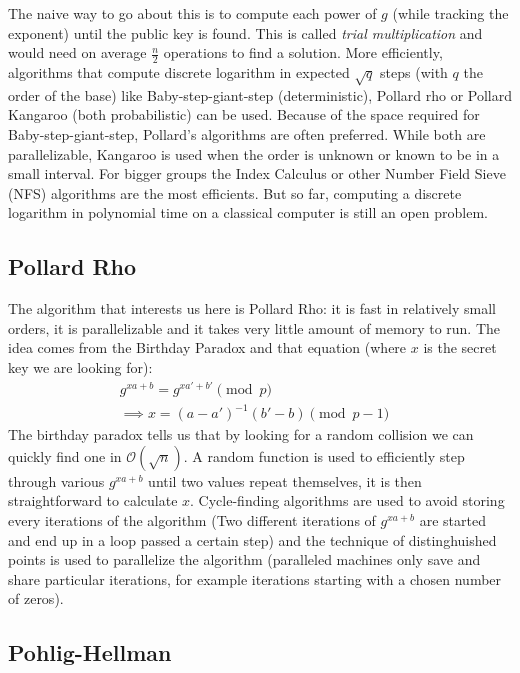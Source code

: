 \documentclass[a4paper,11pt,twocolumn]{article}
\begin{document}
The naive way to go about this is to compute each power of $g$ (while tracking the exponent) until the public key is found. This is called \emph{trial multiplication} and would need on average $\frac{n}{2}$ operations to find a solution.
More efficiently, algorithms that compute discrete logarithm in expected $\sqrt{q}$ steps (with $q$ the order of the base) like Baby-step-giant-step (deterministic), Pollard rho or Pollard Kangaroo (both probabilistic) can be used. Because of the space required for Baby-step-giant-step, Pollard's algorithms are often preferred. While both are parallelizable, Kangaroo is used when the order is unknown or known to be in a small interval. For bigger groups the Index Calculus or other Number Field Sieve (NFS) algorithms are the most efficients. But so far, computing a discrete logarithm in polynomial time on a classical computer is still an open problem.\\

\subsection{Pollard Rho}

The algorithm that interests us here is Pollard Rho: it is fast in relatively small orders, it is parallelizable and it takes very little amount of memory to run. The idea comes from the Birthday Paradox and that equation (where $x$ is the secret key we are looking for):
\begin{align*}
  g^{xa +b } = g^{xa' + b'} \pmod{p}&\\
  \implies x = (a-a')^{-1} (b' - b) \pmod{p-1}&
\end{align*}
The birthday paradox tells us that by looking for a random collision we can quickly find one in $\mathcal{O}(\sqrt{n})$. A random function is used to efficiently step through various $g^{xa + b}$ until two values repeat themselves, it is then straightforward to calculate $x$. Cycle-finding algorithms are used to avoid storing every iterations of the algorithm (Two different iterations of $g^{xa+b}$ are started and end up in a loop passed a certain step) and the technique of distinghuished points is used to parallelize the algorithm (paralleled machines only save and share particular iterations, for example iterations starting with a chosen number of zeros).

\subsection{Pohlig-Hellman}
\end{document}
